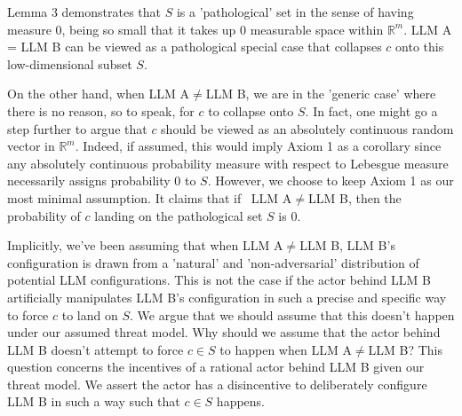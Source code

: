 \documentclass{article}
\begin{document}
Lemma 3 demonstrates that $\displaystyle S$ is a 'pathological' set in the sense of having measure 0, being so small that it takes up 0 measurable space within $\displaystyle \mathbb{R}^{m}$. LLM A = LLM B can be viewed as a pathological special case that collapses $\displaystyle c$ onto this low-dimensional subset $\displaystyle S$.



On the other hand, when LLM A$\displaystyle \neq $LLM B, we are in the 'generic case' where there is no reason, so to speak, for $\displaystyle c$ to collapse onto $\displaystyle S$. In fact, one might go a step further to argue that $\displaystyle c$ should be viewed as an absolutely continuous random vector in $\displaystyle \mathbb{R}^{m}$. Indeed, if assumed, this would imply Axiom 1 as a corollary since any absolutely continuous probability measure with respect to Lebesgue measure necessarily assigns probability 0 to $\displaystyle S$. However, we choose to keep Axiom 1 as our most minimal assumption. It claims that if \ LLM A$\displaystyle \neq $LLM B, then the probability of $\displaystyle c$ landing on the pathological set $\displaystyle S$ is 0.



Implicitly, we've been assuming that when LLM A$\displaystyle \neq $LLM B, LLM B's configuration is drawn from a 'natural' and 'non-adversarial' distribution of potential LLM configurations. This is not the case if the actor behind LLM B artificially manipulates LLM B's configuration in such a precise and specific way to force $\displaystyle c$ to land on $\displaystyle S$. We argue that we should assume that this doesn't happen under our assumed threat model. Why should we assume that the actor behind LLM B doesn't attempt to force $\displaystyle c\in S$ to happen when LLM A$\displaystyle \neq $LLM B? This question concerns the incentives of a rational actor behind LLM B given our threat model. We assert the actor has a disincentive to deliberately configure LLM B in such a way such that $\displaystyle c\in S$ happens.
\end{document}

